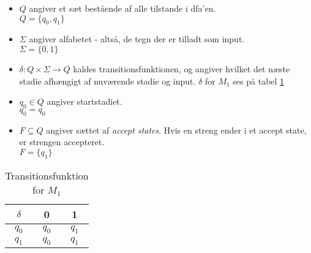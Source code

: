 \begin{itemize}
    \item $Q$ angiver et sæt bestående af alle tilstande i \gls{dfa}'en.\\
        $Q = \{q_0, q_1\}$
    \item $\Sigma$ angiver alfabetet - altså, de tegn der er tilladt som input.\\
        $\Sigma = \{0, 1\}$
    \item $\delta: Q \times \Sigma \rightarrow Q$ kaldes transitionsfunktionen, og angiver hvilket det næste stadie afhængigt af nuværende stadie og input. $\delta$ for $M_1$ ses på tabel \ref{tab:transfunk_m1}
    \item $q_0 \in Q$ angiver startstadiet.\\
        $q_0 = q_0$
    \item $F \subseteq Q$ angiver sættet af \textit{accept states}. Hvis en streng ender i et accept state, er strengen accepteret.\\
        $F = \{q_1\}$
\end{itemize}

\begin{table}[H]
    \centering
        \begin{tabular}{ c|c c }
        \centering
            $\delta$ & 0 & 1\\ \hline 
            $q_0$ & $q_0$ & $q_1$\\
            $q_1$ & $q_0$ & $q_1$\\
        \end{tabular}
    \caption{Transitionsfunktion for $M_1$}
    \label{tab:transfunk_m1}
\end{table}





